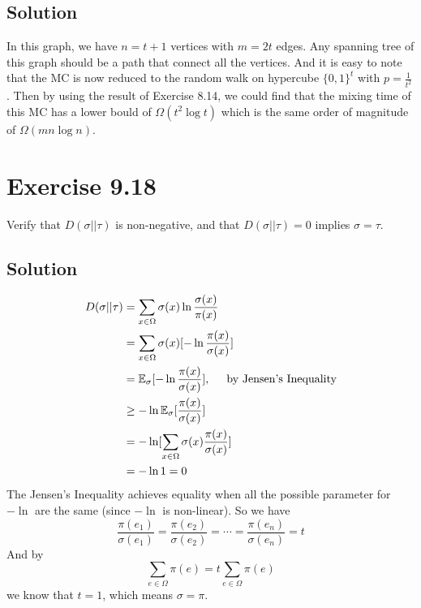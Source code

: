 \documentclass{article}
\begin{document}
\subsection{Solution}
\begin{center}
\end{center}
In this graph, we have $n = t+1$ vertices with $m = 2t$ edges.
Any spanning tree of this graph should be a path that connect all the vertices.
And it is easy to note that the MC is now reduced to the random walk on hypercube $\{0, 1\}^t$ with $p = \frac{1}{t^2}$. Then by using the result of Exercise 8.14, we could find that the mixing time of this MC has a lower bould of $\Omega(t^2\log t)$ which is the same order of magnitude of $\Omega(mn\log n)$.

\section{Exercise 9.18}
Verify that $D(\sigma || \tau)$ is non-negative, and that $D(\sigma||\tau)=0$ implies $\sigma = \tau$.
\subsection{Solution}
\begin{align*}
  D(\sigma || \tau) &= \sum_{x\in\Omega} \sigma(x) \ln \frac{\sigma(x)}{\pi(x)} \\
  &= \sum_{x\in\Omega} \sigma(x) [- \ln \frac{\pi(x)}{\sigma(x)}] \\
  &= \mathbb{E}_{\sigma} [-\ln \frac{\pi(x)}{\sigma(x)}], \hspace{0.5cm} \mbox{by Jensen's Inequality} \\
  &\geq -\ln \mathbb{E}_\sigma [\frac{\pi(x)}{\sigma(x)}] \\
  &= -\ln [\sum_{x\in\Omega}\sigma(x) \frac{\pi(x)}{\sigma(x)}] \\
  &= -\ln 1 = 0
\end{align*}
The Jensen's Inequality achieves equality when all the possible parameter for $-\ln$ are the same (since $-\ln$ is non-linear). So we have
\[\frac{\pi(e_1)}{\sigma(e_1)} = \frac{\pi(e_2)}{\sigma(e_2)} =  \cdots =  \frac{\pi(e_n)}{\sigma(e_n)} = t\]
And by
\[\sum_{e\in\Omega} \pi(e) = t\sum_{e\in\Omega}\pi(e)\]
we know that $t = 1$, which means $\sigma = \pi$.
\end{document}
